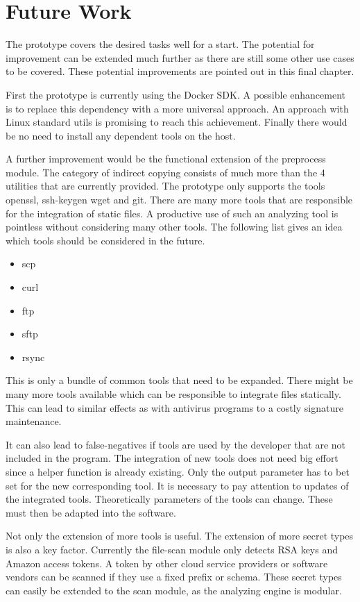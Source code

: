 \chapter{Future Work}
\label{ch:end:future}
The prototype covers the desired tasks well for a start.
The potential for improvement can be extended much further as there are still some other use cases to be covered.
These potential improvements are pointed out in this final chapter.

First the prototype is currently using the Docker SDK. 
A possible enhancement is to replace this dependency with a more universal approach. 
An approach with Linux standard utils is promising to reach this achievement.
Finally there would be no need to install any dependent tools on the host.

A further improvement would be the functional extension of the preprocess module.
The category of indirect copying consists of much more than the 4 utilities that are currently provided.
The prototype only supports the tools openssl, ssh-keygen wget and git.
There are many more tools that are responsible for the integration of static files. 
A productive use of such an analyzing tool is pointless without considering many other tools.
The following list gives an idea which tools should be considered in the future.
\begin{itemize}
\item scp
\item curl
\item ftp
\item sftp
\item rsync
\end{itemize}
This is only a bundle of common tools that need to be expanded.
There might be many more tools available which can be responsible to integrate files statically.
This can lead to similar effects as with antivirus programs to a costly signature maintenance.

It can also lead to false-negatives if tools are used by the developer that are not included in the program.
The integration of new tools does not need big effort since a helper function is already existing.
Only the output parameter has to bet set for the new corresponding tool.
It is necessary to pay attention to updates of the integrated tools.
Theoretically parameters of the tools can change. 
These must then be adapted into the software.

Not only the extension of more tools is useful. The extension of more secret types is also a key factor.
Currently the file-scan module only detects RSA keys and Amazon access tokens.
A token by other cloud service providers or software vendors can be scanned if they use a fixed prefix or schema.
These secret types can easily be extended to the scan module, as the analyzing engine is modular.

